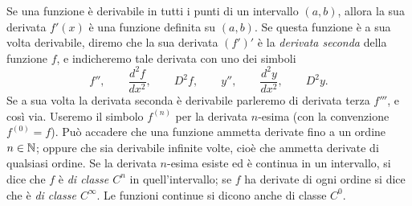 Se una funzione è derivabile in tutti i punti di un intervallo $(a,b)$, allora la sua
derivata $f'(x)$ è una funzione definita su $(a,b)$. Se questa funzione è a sua volta
derivabile, diremo che la sua derivata $(f')'$ è la \emph{derivata seconda} della
funzione $f$, e indicheremo tale derivata con uno dei simboli
\begin{equation}\label{eq:notazioni-derivata-seconda}
  f'', \qquad \frac{d^{2}f}{dx^{2}}, \qquad D^{2}f, \qquad y'', \qquad \frac{d^{2}y}{dx^{2}},
  \qquad D^{2}y .
\end{equation}
Se a sua volta la derivata seconda è derivabile parleremo di derivata terza $f'''$, e
così via. Useremo il simbolo $f^{(n)}$ per la derivata $n$-esima (con la convenzione
$f^{(0)}=f$). Può accadere che una funzione ammetta derivate fino a un ordine
$n\in\mathbb{N}$; oppure che sia derivabile infinite volte, cioè che ammetta derivate di
qualsiasi ordine. Se la derivata $n$-esima esiste ed è continua in un intervallo, si
dice che $f$ è \emph{di classe $C^{n}$} in quell'intervallo; se $f$ ha derivate di
ogni ordine si dice che è \emph{di classe $C^{\infty}$}. Le funzioni continue si dicono
anche di classe $C^{0}$.

